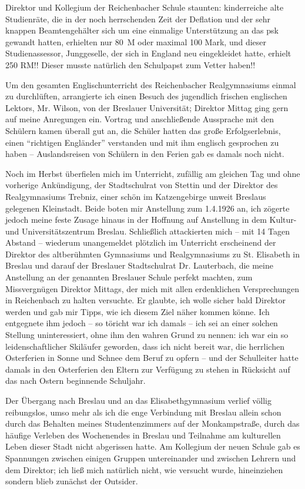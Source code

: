 Direktor und Kollegium der Reichenbacher Schule staunten: kinderreiche alte Studienräte, die in der noch herrschenden Zeit der Deflation und der sehr knappen Beamtengehälter sich um eine einmalige Unterstützung an das \ac{psk} gewandt hatten, erhielten nur 80~M oder maximal 100 Mark, und dieser Studienassessor, Junggeselle, der sich in England neu eingekleidet hatte, erhielt 250 RM!! Dieser musste natürlich den Schulpapst zum Vetter haben!!

Um den gesamten Englischunterricht des Reichenbacher Realgymnasiums einmal zu durchlüften, arrangierte ich einen Besuch des jugendlich frischen englischen Lektors, Mr. Wilson, von der Breslauer Universität; Direktor Mittag ging gern auf meine Anregungen ein. Vortrag und anschließende Aussprache mit den Schülern kamen überall gut an, die Schüler hatten das große Erfolgserlebnis, einen \enquote{richtigen Engländer} verstanden und mit ihm englisch gesprochen zu haben -- Auslandsreisen von Schülern in den Ferien gab es damals noch nicht.

Noch im Herbst überfielen mich im Unterricht, zufällig am gleichen Tag und ohne vorherige Ankündigung, der Stadtschulrat von Stettin und der Direktor des Realgymnasiums Trebniz, einer schön im Katzengebirge unweit Breslaus gelegenen Kleinstadt. Beide boten mir Anstellung zum 1.4.1926 an, ich zögerte jedoch meine feste Zusage hinaus in der Hoffnung auf Anstellung in dem Kultur- und Universitätszentrum Breslau. Schließlich attackierten mich -- mit 14 Tagen Abstand -- wiederum unangemeldet plötzlich im Unterricht erscheinend der Direktor des altberühmten Gymnasiums und Realgymnasiums zu St. Elisabeth in Breslau und darauf der Breslauer Stadtschulrat Dr. Lauterbach, die meine Anstellung an der genannten Breslauer Schule perfekt machten, zum Missvergnügen Direktor Mittags, der mich mit allen erdenklichen Versprechungen in Reichenbach zu halten versuchte. Er glaubte, ich wolle sicher bald Direktor werden und gab mir Tipps, wie ich diesem Ziel näher kommen könne. Ich entgegnete ihm jedoch -- so töricht war ich damals -- ich sei an einer solchen Stellung uninteressiert, ohne ihm den wahren Grund zu nennen: ich war ein so leidenschaftlicher Skiläufer geworden, dass ich nicht bereit war, die herrlichen Osterferien in Sonne und Schnee dem Beruf zu opfern -- und der Schulleiter hatte damals in den Osterferien den Eltern zur Verfügung zu stehen in Rücksicht auf das nach Ostern beginnende Schuljahr.

Der Übergang nach Breslau und an das Elisabethgymnasium verlief völlig reibungslos, umso mehr als ich die enge Verbindung mit Breslau allein schon durch das Behalten meines Studentenzimmers auf der Monkampstraße, durch das häufige Verleben des Wochenendes in Breslau und Teilnahme am kulturellen Leben dieser Stadt nicht abgerissen hatte. Am Kollegium der neuen Schule gab es Spannungen zwischen einigen Gruppen untereinander und zwischen Lehrern und dem Direktor; ich ließ mich natürlich nicht, wie versucht wurde, hineinziehen sondern blieb zunächst der Outsider.\\

